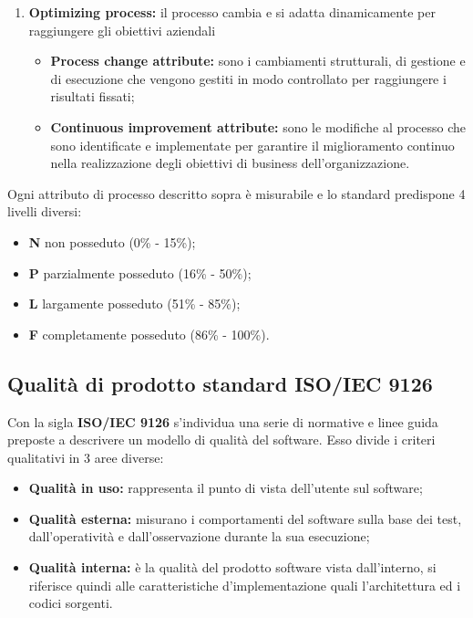 \begin{enumerate}[label*=\arabic*]
\item \textbf{Optimizing process:} il processo cambia e si adatta dinamicamente per raggiungere gli obiettivi aziendali
		\begin{itemize}
			\item \textbf{Process change attribute:} sono i cambiamenti strutturali, di gestione e di esecuzione che vengono gestiti in modo controllato per raggiungere i risultati fissati;
			\item \textbf{Continuous improvement attribute:} sono le modifiche al processo che sono identificate e implementate per garantire il miglioramento continuo nella realizzazione degli obiettivi di \gls{business} dell'organizzazione.
		\end{itemize}

\end{enumerate}

\noindent Ogni attributo di processo descritto sopra è misurabile e lo standard predispone 4 livelli diversi:
\begin{itemize}[label={}]
	\item \textbf{N} non posseduto (0\% - 15\%);
	\item \textbf{P} parzialmente posseduto (16\% - 50\%);
	\item \textbf{L} largamente posseduto (51\% - 85\%);
	\item \textbf{F} completamente posseduto (86\% - 100\%).
\end{itemize}

\subsection{Qualità di prodotto standard ISO/IEC 9126} \label{9126}
Con la sigla \textbf{ISO/IEC 9126} s'individua una serie di normative e linee guida preposte a descrivere un modello di qualità del software.
Esso divide i criteri qualitativi in 3 aree diverse:
\begin{itemize}

	\item \textbf{Qualità in uso:} rappresenta il punto di vista dell'utente sul software;
	\item \textbf{Qualità esterna:} misurano i comportamenti del software sulla base dei test, dall'operatività e dall'osservazione durante la sua esecuzione;
	\item \textbf{Qualità interna:} è la qualità del prodotto software vista dall'interno, si riferisce quindi alle caratteristiche d'implementazione quali l'architettura ed i codici sorgenti.
\end{itemize}

